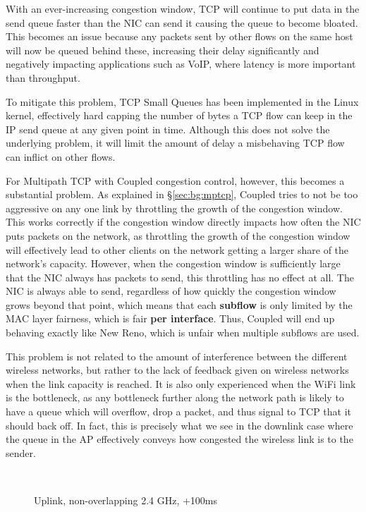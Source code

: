 With an ever-increasing congestion window, TCP will continue to put data in the
send queue faster than the NIC can send it causing the queue to become bloated.
This becomes an issue because any packets sent by other flows on the same host
will now be queued behind these, increasing their delay significantly and
negatively impacting applications such as VoIP, where latency is more important
than throughput.

To mitigate this problem, TCP Small Queues has been implemented in the Linux
kernel, effectively hard capping the number of bytes a TCP flow can keep in the
IP send queue at any given point in time. Although this does not solve the
underlying problem, it will limit the amount of delay a misbehaving TCP flow can
inflict on other flows.

For Multipath TCP with Coupled congestion control, however, this becomes a
substantial problem. As explained in \S\ref{sec:bg:mptcp}, Coupled tries to not
be too aggressive on any one link by throttling the growth of the congestion
window. This works correctly if the congestion window directly impacts how often
the NIC puts packets on the network, as throttling the growth of the congestion
window will effectively lead to other clients on the network getting a larger
share of the network's capacity. However, when the congestion window is
sufficiently large that the NIC always has packets to send, this throttling has
no effect at all. The NIC is always able to send, regardless of how quickly the
congestion window grows beyond that point, which means that each
\textbf{subflow} is only limited by the MAC layer fairness, which is fair
\textbf{per interface}. Thus, Coupled will end up behaving exactly like New
Reno, which is unfair when multiple subflows are used.

This problem is not related to the amount of interference between the different
wireless networks, but rather to the lack of feedback given on wireless networks
when the link capacity is reached. It is also only experienced when the WiFi
link is the bottleneck, as any bottleneck further along the network path is
likely to have a queue which will overflow, drop a packet, and thus signal to
TCP that it should back off. In fact, this is precisely what we see in the
downlink case where the queue in the AP effectively conveys how congested the
wireless link is to the sender.

\begin{figure}[h]
 \centering
 \subfloat[][CDF] {\
   \label{graph:fairness-rtt-up-cdf}
 }
 \\
 \subfloat[][Multipath TCP time plot] {\
   \label{graph:fairness-rtt-up-close}
 }
 \caption{Uplink, non-overlapping 2.4 GHz, +100ms}\label{graph:fairness-rtt-up}
\end{figure}

